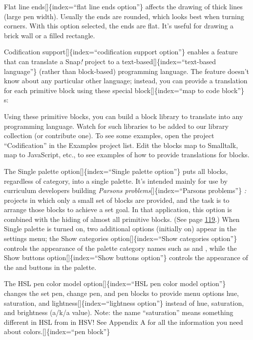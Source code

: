 \documentclass[
  letterpaper,
]{book}
\begin{document}
Flat line ends{[}{]}\{index=``flat line ends option''\} affects the
drawing of thick lines (large pen width). Usually the ends are rounded,
which looks best when turning corners. With this option selected, the
ends are flat. It's useful for drawing a brick wall or a filled
rectangle.

Codification support{[}{]}\{index=``codification support option''\}
enables a feature that can translate a Snap\emph{!} project to a
text-based{[}{]}\{index=``text-based language''\} (rather than
block-based) programming language. The feature doesn't know about any
particular other language; instead, you can provide a translation for
each primitive block using these special block{[}{]}\{index=``map to
code block''\} s:

Using these primitive blocks, you can build a block library to translate
into any programming language. Watch for such libraries to be added to
our library collection (or contribute one). To see some examples, open
the project ``Codification'' in the Examples project list. Edit the
blocks map to Smalltalk, map to JavaScript, etc., to see examples of how
to provide translations for blocks.

The Single palette option{[}{]}\{index=``Single palette option''\} puts
all blocks, regardless of category, into a single palette. It's intended
mainly for use by curriculum developers building \emph{Parsons
problems}{[}{]}\{index=``Parsons problems''\} \emph{:} projects in which
only a small set of blocks are provided, and the task is to arrange
those blocks to achieve a set goal. In that application, this option is
combined with the hiding of almost all primitive blocks. (See page
\hyperref[context-menus-for-palette-blocks]{119}.) When Single palette
is turned on, two additional options (initially on) appear in the
settings menu; the Show categories option{[}{]}\{index=``Show categories
option''\} controls the appearance of the palette category names such as
and , while the Show buttons option{[}{]}\{index=``Show buttons
option''\} controls the appearance of the and buttons in the palette.

The HSL pen color model option{[}{]}\{index=``HSL pen color model
option''\} changes the set pen, change pen, and pen blocks to provide
menu options hue, saturation, and lightness{[}{]}\{index=``lightness
option''\} instead of hue, saturation, and brightness (a/k/a value).
Note: the name ``saturation'' means something different in HSL from in
HSV! See Appendix A for all the information you need about
colors.{[}{]}\{index=``pen block''\}
\end{document}
